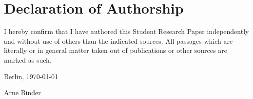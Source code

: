 
\section*{Declaration of Authorship}

I hereby confirm that I have authored this Student Research Paper independently and without use of others than the indicated
sources. All passages which are literally or in general matter
taken out of publications or other sources are marked as such.
\vspace{1cm}

Berlin, \today \vspace{0.5cm}

Arne Binder
